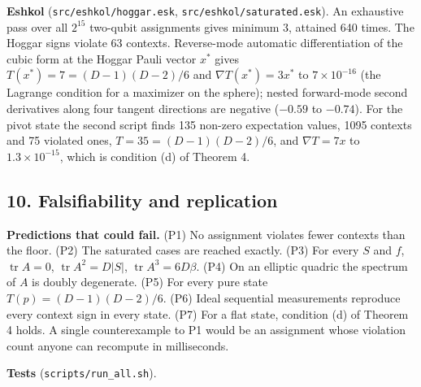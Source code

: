 \documentclass[11pt,a4paper]{article}
\begin{document}
\textbf{Eshkol} (\texttt{src/eshkol/hoggar.esk}, \texttt{src/eshkol/saturated.esk}). An exhaustive pass over all \(2^{15}\)
two-qubit assignments gives minimum 3, attained 640 times. The Hoggar signs violate 63 contexts.
Reverse-mode automatic differentiation of the cubic form at the Hoggar Pauli vector \(x^\ast\) gives
\(T(x^\ast) = 7 = (D-1)(D-2)/6\) and \(\nabla T(x^\ast) = 3x^\ast\) to \(7\times10^{-16}\) (the Lagrange condition
for a maximizer on the sphere); nested forward-mode second derivatives along four tangent directions are
negative (\(-0.59\) to \(-0.74\)). For the pivot state the second script finds 135 non-zero expectation
values, 1095 contexts and 75 violated ones, \(T = 35 = (D-1)(D-2)/6\), and \(\nabla T = 7x\) to
\(1.3\times10^{-15}\), which is condition (d) of Theorem 4.

\subsection{10. Falsifiability and replication}\label{10-falsifiability-and-replication}

\textbf{Predictions that could fail.} (P1) No assignment violates fewer contexts than the floor. (P2) The
saturated cases are reached exactly. (P3) For every \(S\) and \(f\), \(\operatorname{tr}A = 0\),
\(\operatorname{tr}A^2 = D|S|\), \(\operatorname{tr}A^3 = 6D\beta\). (P4) On an elliptic quadric the spectrum of
\(A\) is doubly degenerate. (P5) For every pure state \(T(p) = (D-1)(D-2)/6\). (P6) Ideal sequential
measurements reproduce every context sign in every state. (P7) For a flat state, condition (d) of
Theorem 4 holds. A single counterexample to P1 would be an assignment whose violation count anyone can
recompute in milliseconds.

\textbf{Tests} (\texttt{scripts/run\_all.sh}).
\end{document}
